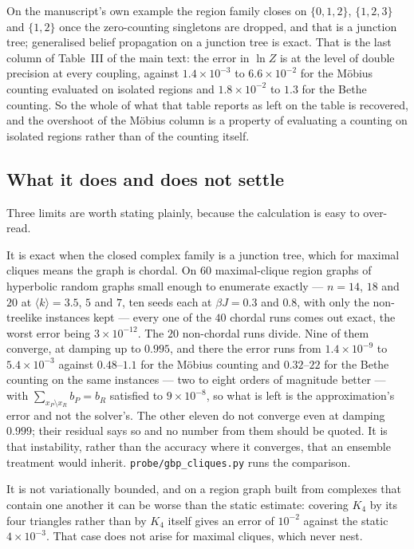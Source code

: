 \documentclass[aps,pre,onecolumn,superscriptaddress,floatfix,nofootinbib]{revtex4-2}
\newcommand{\ave}[1]{\langle #1 \rangle}
\newcommand{\code}[1]{\texttt{#1}}
\begin{document}
On the manuscript's own example the region family closes on
$\{0,1,2\}$, $\{1,2,3\}$ and $\{1,2\}$ once the zero-counting singletons are
dropped, and that is a junction tree; generalised belief propagation on a
junction tree is exact. That is the last column of Table~III of the main text:
the error in $\ln Z$ is at the level of double precision at every coupling,
against $1.4\times10^{-3}$ to $6.6\times10^{-2}$ for the M\"obius counting
evaluated on isolated regions and $1.8\times10^{-2}$ to $1.3$ for the Bethe
counting. So the whole of what that table reports as left on the table is
recovered, and the overshoot of the M\"obius column is a property of evaluating
a counting on isolated regions rather than of the counting itself.


\subsection{What it does and does not settle}

Three limits are worth stating plainly, because the calculation is easy to
over-read.

It is exact when the closed complex family is a junction tree, which for
maximal cliques means the graph is chordal. On $60$ maximal-clique region graphs
of hyperbolic random graphs small enough to enumerate exactly --- $n=14$, $18$
and $20$ at $\ave{k}=3.5$, $5$ and $7$, ten seeds each at $\beta J=0.3$ and
$0.8$, with only the non-treelike instances kept --- every one of the $40$
chordal runs comes out exact, the worst error being $3\times10^{-12}$.
The $20$ non-chordal runs divide. Nine of them converge, at damping up to
$0.995$, and there the error runs from $1.4\times10^{-9}$ to $5.4\times10^{-3}$
against $0.48$--$1.1$ for the M\"obius counting and $0.32$--$22$ for the Bethe
counting on the same instances --- two to eight orders of magnitude better ---
with $\sum_{x_P\setminus x_R}b_P=b_R$ satisfied to $9\times10^{-8}$, so what is
left is the approximation's error and not the solver's. The other eleven do not
converge even at damping $0.999$; their residual says so and no number from them
should be quoted. It is that instability, rather than the accuracy where it
converges, that an ensemble treatment would inherit. \code{probe/gbp\_cliques.py}
runs the comparison.

It is not variationally bounded, and on a region graph built from complexes that
contain one another it can be worse than the static estimate: covering $K_4$ by
its four triangles rather than by $K_4$ itself gives an error of $10^{-2}$
against the static $4\times10^{-3}$. That case does not arise for maximal
cliques, which never nest.
\end{document}
